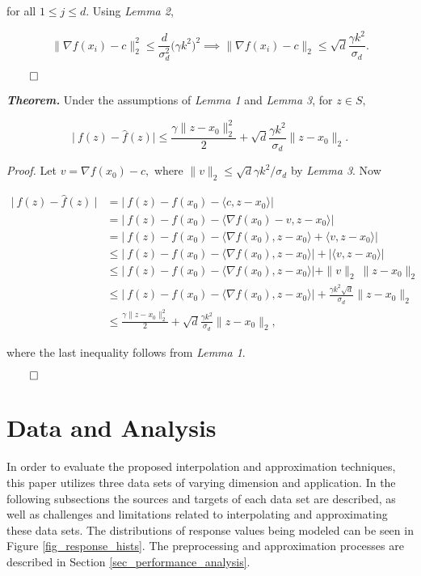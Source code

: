 \documentclass[sigconf]{acmart}
\begin{document}
for all $1 \leq j \leq d.$ Using {\it Lemma 2},

$$\big \| \nabla f(x_i) - c \big \|_2^2 \leq \frac{d}{\sigma_d^2} \big( \gamma k^2\big)^2 \implies \big \| \nabla f(x_i) - c \big \|_2 \leq \sqrt{d} \frac{\gamma k^2}{\sigma_d}.$$

$\qed$

\noindent \textbf{\textit{Theorem.}} Under the assumptions of {\it Lemma 1} and {\it Lemma 3}, for $z \in S,$

$$ \big|\ f(z) - \hat f(z)\big| \leq \frac{\gamma \|z - x_0\|_2^2}{2} + \sqrt{d} \frac{\gamma k^2}{\sigma_d} \|z - x_0\|_2.$$

\noindent \textit{Proof.} Let $v = \nabla f(x_0) - c,$ where $\|v\|_2 \leq \sqrt{d} \gamma k^2 / \sigma_d$ by {\it Lemma 3}. Now

\begin{align*}
       \big|\ f(z) - \hat f(z)\ \big| &= \big|\ f(z) - f(x_0) - \langle c, z - x_0 \rangle \big| \\ 
       &= \big|\ f(z) - f(x_0) - \langle \nabla f(x_0) - v, z - x_0 \rangle \big| \\
       &= \big|\ f(z) - f(x_0) - \langle \nabla f(x_0) , z - x_0 \rangle + \langle v , z - x_0 \rangle \big| \\
       &\leq \big|\ f(z) - f(x_0) - \langle \nabla f(x_0) , z - x_0 \rangle \big| + \big| \langle v , z - x_0 \rangle \big| \\
       &\leq \big|\ f(z) - f(x_0) - \langle \nabla f(x_0) , z - x_0 \rangle \big| + \|v\|_2 \ \|z - x_0\|_2 \\
       &\leq \big|\ f(z) - f(x_0) - \langle \nabla f(x_0), z - x_0 \rangle \big| + \textstyle{\frac{\gamma k^2 \sqrt{d}}{\sigma_d}} \|z - x_0\|_2 \\
       &\leq \frac{\gamma \|z - x_0\|_2^2}{2} + \sqrt{d}\frac{\gamma k^2}{\sigma_d} \|z - x_0\|_2,
\end{align*}

where the last inequality follows from {\it Lemma 1}.

$\qed$

\section{Data and Analysis}
In order to evaluate the proposed interpolation and approximation techniques, this paper utilizes three data sets of varying dimension and application. In the following subsections the sources and targets of each data set are described, as well as challenges and limitations related to interpolating and approximating these data sets. The distributions of response values being modeled can be seen in Figure \ref{fig_response_hists}. The preprocessing and approximation processes are described in Section \ref{sec_performance_analysis}.
\end{document}
